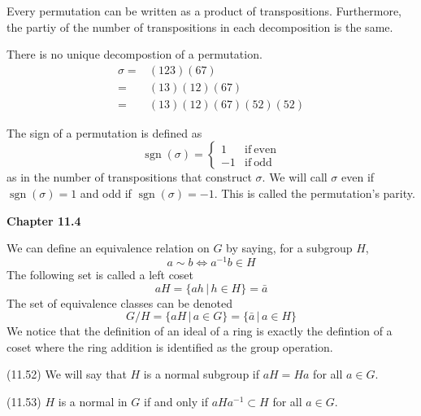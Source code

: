\vspace{2ex}
\begin{thm}
Every permutation can be written as a product of transpositions. Furthermore, the partiy of the number of transpositions in each decomposition is the same.
\end{thm}
\vspace{2ex}
\begin{ex}
There is no unique decompostion of a permutation.
\begin{align*}
\sigma =&(123)(67)\\=&(13)(12)(67)\\=&(13)(12)(67)(52)(52)
\end{align*}
\end{ex}
\vspace{2ex}
\begin{defi}
The sign of a permutation is defined as
\[\mathop{\mathrm{sgn}}(\sigma)=
\begin{cases}
1&\mathrm{if\ even }\\
-1&\mathrm{if\ odd }
\end{cases}
\]
as in the number of transpositions that construct $\sigma $. We will call $\sigma $ even if $\mathop{\mathrm{sgn}}(\sigma)=1 $ and odd if $\mathop{\mathrm{sgn}}(\sigma) =-1$. This is called the permutation's parity.
\end{defi}
\vspace{2ex}
{\bf Chapter 11.4}
\newline
\begin{defi}
We can define an equivalence relation on $G$ by saying, for a subgroup $H$, 
\[a\sim b\iff a^{-1}b\in H\]
The following set is called a left coset
\[aH=\{ah \,|\, h\in H\}=\bar{a}\]
The set of equivalence classes can be denoted
\[G/H=\{aH \,|\, a\in G\}=\{\bar{a} \,|\, a\in H\}\]
We notice that the definition of an ideal of a ring is exactly the defintion of a coset where the ring addition is identified as the group operation.
\end{defi}
\vspace{2ex}
\begin{defi}
(11.52) We will say that $H$ is a normal subgroup if $aH=Ha$ for all $a\in G$. 
\end{defi}
\vspace{2ex}
\begin{rmk}
(11.53) $H$ is a normal in $G$ if and only if $aHa^{-1}\subset H$ for all $a\in G$. 
\end{rmk}
\vspace{2ex}

